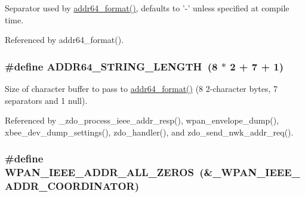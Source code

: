 Separator used by \hyperlink{group__wpan__types_ga448782f4aed0821758969b47221417ed}{addr64\-\_\-format()}, defaults to '-\/' unless specified at compile time. 



Referenced by addr64\-\_\-format().

\hypertarget{group__wpan__types_gac468b40b060897498f923923654c3d4a}{
\subsubsection[{A\-D\-D\-R64\-\_\-\-S\-T\-R\-I\-N\-G\-\_\-\-L\-E\-N\-G\-T\-H}]{\setlength{\rightskip}{0pt plus 5cm}\#define A\-D\-D\-R64\-\_\-\-S\-T\-R\-I\-N\-G\-\_\-\-L\-E\-N\-G\-T\-H~(8 $\ast$ 2 + 7 + 1)}}\label{group__wpan__types_gac468b40b060897498f923923654c3d4a}


Size of character buffer to pass to \hyperlink{group__wpan__types_ga448782f4aed0821758969b47221417ed}{addr64\-\_\-format()} (8 2-\/character bytes, 7 separators and 1 null). 



Referenced by \-\_\-zdo\-\_\-process\-\_\-ieee\-\_\-addr\-\_\-resp(), wpan\-\_\-envelope\-\_\-dump(), xbee\-\_\-dev\-\_\-dump\-\_\-settings(), zdo\-\_\-handler(), and zdo\-\_\-send\-\_\-nwk\-\_\-addr\-\_\-req().

\hypertarget{group__wpan__types_ga014f9d0857312b6a7f80ee10ecfd0935}{
\subsubsection[{W\-P\-A\-N\-\_\-\-I\-E\-E\-E\-\_\-\-A\-D\-D\-R\-\_\-\-A\-L\-L\-\_\-\-Z\-E\-R\-O\-S}]{\setlength{\rightskip}{0pt plus 5cm}\#define W\-P\-A\-N\-\_\-\-I\-E\-E\-E\-\_\-\-A\-D\-D\-R\-\_\-\-A\-L\-L\-\_\-\-Z\-E\-R\-O\-S~(\&{\bf \-\_\-\-W\-P\-A\-N\-\_\-\-I\-E\-E\-E\-\_\-\-A\-D\-D\-R\-\_\-\-C\-O\-O\-R\-D\-I\-N\-A\-T\-O\-R})}}\label{group__wpan__types_ga014f9d0857312b6a7f80ee10ecfd0935}


